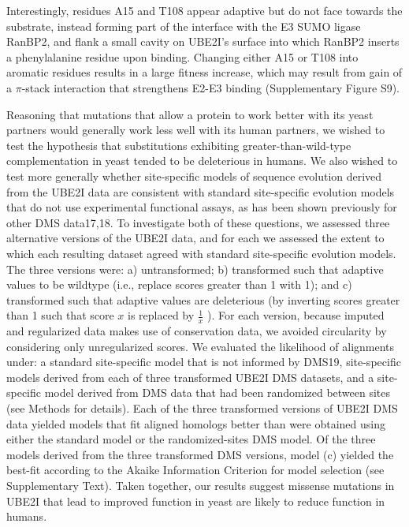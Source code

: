 Interestingly, residues A15 and T108 appear adaptive but do not face towards the substrate, instead forming part of the interface with the E3 SUMO ligase RanBP2, and flank a small cavity on UBE2I’s surface into which RanBP2 inserts a phenylalanine residue upon binding. Changing either A15 or T108 into aromatic residues results in a large fitness increase, which may result from gain of a $\pi$-stack interaction that strengthens E2-E3 binding (Supplementary Figure S9).

Reasoning that mutations that allow a protein to work better with its yeast partners would generally work less well with its human partners, we wished to test the hypothesis that substitutions exhibiting greater-than-wild-type complementation in yeast tended to be deleterious in humans. We also wished to test more generally whether site-specific models of sequence evolution derived from the UBE2I data are consistent with standard site-specific evolution models that do not use experimental functional assays, as has been shown previously for other DMS data17,18. To investigate both of these questions, we assessed three alternative versions of the UBE2I data, and for each we assessed the extent to which each resulting dataset agreed with standard site-specific evolution models.  The three versions were: a) untransformed;  b) transformed such that adaptive values to be wildtype (i.e., replace scores greater than 1 with 1); and c) transformed such that adaptive values are deleterious (by inverting scores greater than 1 such that score $x$ is replaced by $\frac{1}{x}$ ).  For each version, because imputed and regularized data makes use of conservation data, we avoided circularity by considering only unregularized scores.  We evaluated the likelihood of alignments under: a standard site-specific model that is not informed by DMS19, site-specific models derived from each of three transformed UBE2I DMS datasets, and a site-specific model derived from DMS data that had been randomized between sites (see Methods for details).  Each of the three transformed versions of UBE2I DMS data yielded models that fit aligned homologs better than were obtained using either the standard model or the randomized-sites DMS model.  Of the three models derived from the three transformed DMS versions, model (c) yielded the best-fit according to the Akaike Information Criterion for model selection (see Supplementary Text).  Taken together, our results suggest missense mutations in UBE2I that lead to improved function in yeast are likely to reduce function in humans.


